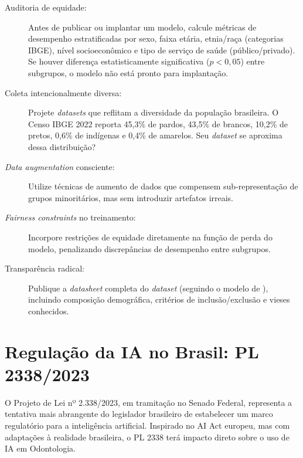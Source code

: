 \begin{description}
  \item[Auditoria de equidade:] Antes de publicar ou implantar um modelo,
    calcule métricas de desempenho estratificadas por sexo, faixa etária,
    etnia/raça (categorias IBGE), nível socioeconômico e tipo de serviço de
    saúde (público/privado). Se houver diferença estatisticamente significativa
    ($p < 0,05$) entre subgrupos, o modelo não está pronto para implantação.

  \item[Coleta intencionalmente diversa:] Projete \textit{datasets} que reflitam
    a diversidade da população brasileira. O Censo IBGE 2022 reporta 45,3\% de
    pardos, 43,5\% de brancos, 10,2\% de pretos, 0,6\% de indígenas e 0,4\% de
    amarelos. Seu \textit{dataset} se aproxima dessa distribuição?

  \item[\textit{Data augmentation} consciente:] Utilize técnicas de aumento de
    dados que compensem sub-representação de grupos minoritários, mas sem
    introduzir artefatos irreais.

  \item[\textit{Fairness constraints} no treinamento:] Incorpore restrições de
    equidade diretamente na função de perda do modelo, penalizando
    discrepâncias de desempenho entre subgrupos.

  \item[Transparência radical:] Publique a \textit{datasheet} completa do
    \textit{dataset} (seguindo o modelo de \cite{gebru2021datasheets}),
    incluindo composição demográfica, critérios de inclusão/exclusão e vieses
    conhecidos.
\end{description}


\section{Regulação da IA no Brasil: PL 2338/2023}
\label{sec:pl-2338}

\nivelquatro

O Projeto de Lei nº 2.338/2023, em tramitação no Senado Federal, representa a
tentativa mais abrangente do legislador brasileiro de estabelecer um marco
regulatório para a inteligência artificial. Inspirado no AI Act europeu, mas
com adaptações à realidade brasileira, o PL 2338 terá impacto direto sobre o
uso de IA em Odontologia.

